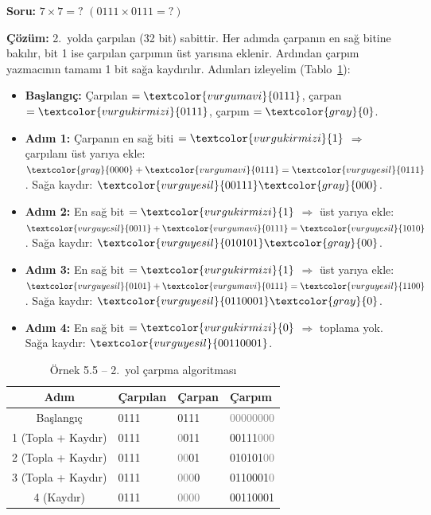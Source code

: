 \begin{ornek}[5.5]
\textbf{Soru:} $7 \times 7 = ?$ \quad $(0111 \times 0111 = ?)$

\textbf{Çözüm:} 2.\ yolda çarpılan (32 bit) sabittir. Her adımda çarpanın en sağ bitine bakılır, bit 1 ise çarpılan çarpımın üst yarısına eklenir. Ardından çarpım yazmacının tamamı 1 bit sağa kaydırılır. Adımları izleyelim (Tablo~\ref{tab:carpma2-ornek}):

\begin{itemize}[nosep]
\item \textbf{Başlangıç:} Çarpılan $= \textcolor{vurgumavi}{0111}$, çarpan $= \textcolor{vurgukirmizi}{0111}$, çarpım $= \textcolor{gray}{0}$.
\item \textbf{Adım 1:} Çarpanın en sağ biti $= \textcolor{vurgukirmizi}{1}$ $\Rightarrow$ çarpılanı üst yarıya ekle: $\textcolor{gray}{0000} + \textcolor{vurgumavi}{0111} = \textcolor{vurguyesil}{0111}$. Sağa kaydır: $\textcolor{vurguyesil}{00111}\textcolor{gray}{000}$.
\item \textbf{Adım 2:} En sağ bit $= \textcolor{vurgukirmizi}{1}$ $\Rightarrow$ üst yarıya ekle: $\textcolor{vurguyesil}{0011} + \textcolor{vurgumavi}{0111} = \textcolor{vurguyesil}{1010}$. Sağa kaydır: $\textcolor{vurguyesil}{010101}\textcolor{gray}{00}$.
\item \textbf{Adım 3:} En sağ bit $= \textcolor{vurgukirmizi}{1}$ $\Rightarrow$ üst yarıya ekle: $\textcolor{vurguyesil}{0101} + \textcolor{vurgumavi}{0111} = \textcolor{vurguyesil}{1100}$. Sağa kaydır: $\textcolor{vurguyesil}{0110001}\textcolor{gray}{0}$.
\item \textbf{Adım 4:} En sağ bit $= \textcolor{vurgukirmizi}{0}$ $\Rightarrow$ toplama yok. Sağa kaydır: $\textcolor{vurguyesil}{00110001}$.
\end{itemize}

\begin{table}[H]
\centering
\caption{Örnek 5.5 -- 2.\ yol çarpma algoritması}
\label{tab:carpma2-ornek}
\small
\begin{tabular}{c l l l}
\toprule
\textbf{Adım} & \textbf{\textcolor{vurgumavi}{Çarpılan}} & \textbf{\textcolor{vurgukirmizi}{Çarpan}} & \textbf{\textcolor{vurguyesil}{Çarpım}} \\
\midrule
Başlangıç & \textcolor{vurgumavi}{0111} & \textcolor{vurgukirmizi}{0111} & \textcolor{gray}{00000000} \\
1 (Topla + Kaydır) & \textcolor{vurgumavi}{0111} & \textcolor{gray}{0}\textcolor{vurgukirmizi}{011} & \textcolor{vurguyesil}{00111}\textcolor{gray}{000} \\
2 (Topla + Kaydır) & \textcolor{vurgumavi}{0111} & \textcolor{gray}{00}\textcolor{vurgukirmizi}{01} & \textcolor{vurguyesil}{010101}\textcolor{gray}{00} \\
3 (Topla + Kaydır) & \textcolor{vurgumavi}{0111} & \textcolor{gray}{000}\textcolor{vurgukirmizi}{0} & \textcolor{vurguyesil}{0110001}\textcolor{gray}{0} \\
4 (Kaydır) & \textcolor{vurgumavi}{0111} & \textcolor{gray}{0000} & \textcolor{vurguyesil}{00110001} \\
\bottomrule
\end{tabular}
\end{table}


\end{ornek}
